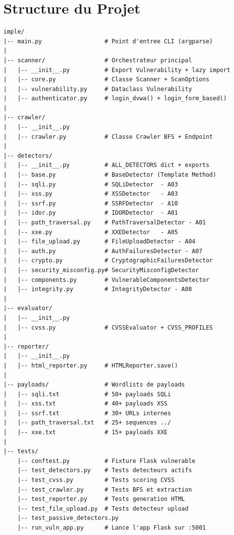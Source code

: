 \documentclass[12pt,a4paper]{report}
\begin{document}
\section{Structure du Projet}

\begin{verbatim}
imple/
|-- main.py                  # Point d'entree CLI (argparse)
|
|-- scanner/                 # Orchestrateur principal
|   |-- __init__.py          # Export Vulnerability + lazy import
|   |-- core.py              # Classe Scanner + ScanOptions
|   |-- vulnerability.py     # Dataclass Vulnerability
|   |-- authenticator.py     # login_dvwa() + login_form_based()
|
|-- crawler/
|   |-- __init__.py
|   |-- crawler.py           # Classe Crawler BFS + Endpoint
|
|-- detectors/
|   |-- __init__.py          # ALL_DETECTORS dict + exports
|   |-- base.py              # BaseDetector (Template Method)
|   |-- sqli.py              # SQLiDetector  - A03
|   |-- xss.py               # XSSDetector   - A03
|   |-- ssrf.py              # SSRFDetector  - A10
|   |-- idor.py              # IDORDetector  - A01
|   |-- path_traversal.py    # PathTraversalDetector - A01
|   |-- xxe.py               # XXEDetector   - A05
|   |-- file_upload.py       # FileUploadDetector - A04
|   |-- auth.py              # AuthFailuresDetector - A07
|   |-- crypto.py            # CryptographicFailuresDetector
|   |-- security_misconfig.py# SecurityMisconfigDetector
|   |-- components.py        # VulnerableComponentsDetector
|   |-- integrity.py         # IntegrityDetector - A08
|
|-- evaluator/
|   |-- __init__.py
|   |-- cvss.py              # CVSSEvaluator + CVSS_PROFILES
|
|-- reporter/
|   |-- __init__.py
|   |-- html_reporter.py     # HTMLReporter.save()
|
|-- payloads/                # Wordlists de payloads
|   |-- sqli.txt             # 50+ payloads SQLi
|   |-- xss.txt              # 40+ payloads XSS
|   |-- ssrf.txt             # 30+ URLs internes
|   |-- path_traversal.txt   # 25+ sequences ../
|   |-- xxe.txt              # 15+ payloads XXE
|
|-- tests/
    |-- conftest.py          # Fixture Flask vulnerable
    |-- test_detectors.py    # Tests detecteurs actifs
    |-- test_cvss.py         # Tests scoring CVSS
    |-- test_crawler.py      # Tests BFS et extraction
    |-- test_reporter.py     # Tests generation HTML
    |-- test_file_upload.py  # Tests detecteur upload
    |-- test_passive_detectors.py
    |-- run_vuln_app.py      # Lance l'app Flask sur :5001
\end{verbatim}
\end{document}

